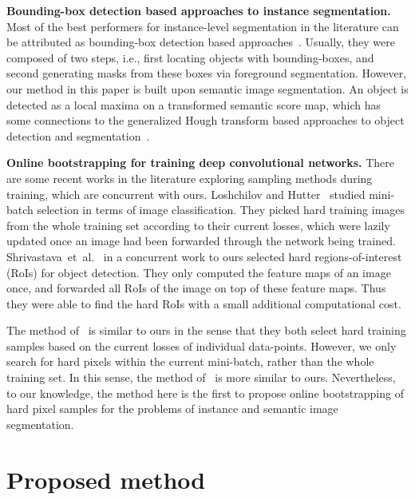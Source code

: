 \documentclass{article}
\begin{document}
\textbf{Bounding-box detection based approaches to instance segmentation.}
Most of the best performers for instance-level segmentation in the literature can be attributed as bounding-box detection based approaches~\cite{SDS.ECCV.2014.Hariharan,HyperColumn.CVPR.2015.Hariharan,MNC.CVPR.2016.Dai}.
Usually, they were composed of two steps, i.e., first locating objects with bounding-boxes,
and second generating masks from these boxes via foreground segmentation.
However, our method in this paper is built upon semantic image segmentation.
An object is detected as a local maxima on a transformed semantic score map,
which has some connections to the generalized Hough transform based approaches to object detection and segmentation~\cite{ISM.IJCV.2007.Leibe}.



\textbf{Online bootstrapping for training deep convolutional networks.}
There are some recent works in the literature exploring sampling methods during training, which are concurrent with ours.
Loshchilov and Hutter~\cite{OHEM.ICLR.2016.Loshchilov} studied mini-batch selection in terms of image classification.
They picked hard training images from the whole training set according to their current losses, which were lazily updated once an image had been forwarded through the network being trained.
Shrivastava~et~al.~\cite{DetOHEM.CVPR.2016.Shrivastava} in a concurrent work to ours selected hard regions-of-interest (RoIs) for object detection.
They only computed the feature maps of an image once, and forwarded all RoIs of the image on top of these feature maps.
Thus they were able to find the hard RoIs with a small additional computational cost.

The method of~\cite{OHEM.ICLR.2016.Loshchilov}
is similar to ours in the sense that they both select hard training samples based on the current losses of individual data-points.
However, we only search for hard pixels within the current mini-batch, rather than the whole training set.
In this sense, the method of~\cite{DetOHEM.CVPR.2016.Shrivastava} is more similar to ours.
Nevertheless, to our knowledge, the method here is the first to propose online bootstrapping of hard
pixel samples for the problems of instance and semantic image segmentation.



\section{Proposed method}
\end{document}
